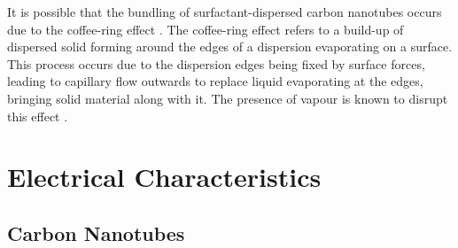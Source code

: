 \documentclass[
  a4paper,
]{scrbook}
\begin{document}
It is possible that the bundling of surfactant-dispersed carbon
nanotubes occurs due to the coffee-ring effect
\autocite{Deegan1997,VanGaalen2021}. The coffee-ring effect refers to a
build-up of dispersed solid forming around the edges of a dispersion
evaporating on a surface. This process occurs due to the dispersion
edges being fixed by surface forces, leading to capillary flow outwards
to replace liquid evaporating at the edges, bringing solid material
along with it. The presence of vapour is known to disrupt this effect
\autocite{Bishop2020}.

\hypertarget{sec-pristine-electrical-characterisation}{%
\section{Electrical
Characteristics}\label{sec-pristine-electrical-characterisation}}

\hypertarget{carbon-nanotubes}{%
\subsection{Carbon Nanotubes}\label{carbon-nanotubes}}
\end{document}
